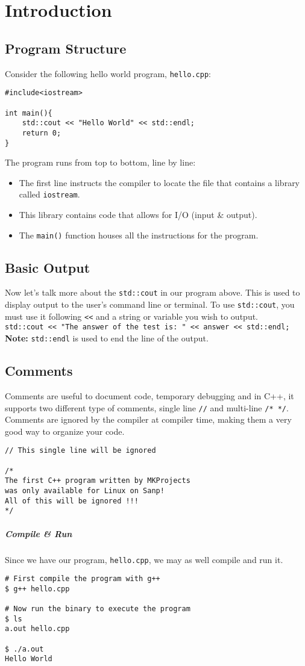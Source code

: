 \chapter{Introduction}
\section{Program Structure}
Consider the following hello world program, \verb!hello.cpp!: 

\begin{verbatim}
#include<iostream> 

int main(){
    std::cout << "Hello World" << std::endl; 
    return 0;
}
\end{verbatim}

\noindent The program runs from top to bottom, line by line:

\begin{itemize}
    \item The first line instructs the compiler to 
    locate the file that contains a library called \verb!iostream!.
    \item This library contains code that allows for I/O (input \& output).
    \item The \verb!main()! function houses all the instructions for the program.
\end{itemize}

\section{Basic Output}
Now let's talk more about the \verb!std::cout! in our program above. 
This is used to display output to the user's command line or terminal.
To use \verb!std::cout!, you must use it following \verb!<<! and a string
or variable you wish to output. 
\\
\verb!std::cout << "The answer of the test is: " << answer << std::endl;!
\\
\textbf{Note:} \verb!std::endl! is used to end the line of the output. 
\newpage
\section{Comments}
Comments are useful to document code, temporary debugging and in C++, it supports two different 
type of comments, single line \verb!//! and multi-line \verb!/* */!. 
Comments are ignored by the compiler at compiler time, making them a very good way to organize your code. 

\begin{verbatim}
// This single line will be ignored

/* 
The first C++ program written by MKProjects 
was only available for Linux on Sanp!
All of this will be ignored !!!
*/ 
\end{verbatim}

\paragraph{Compile \& Run}
Since we have our program, \verb!hello.cpp!, we may as well compile and run it. 

\begin{verbatim}
# First compile the program with g++ 
$ g++ hello.cpp

# Now run the binary to execute the program 
$ ls
a.out hello.cpp

$ ./a.out 
Hello World
\end{verbatim}